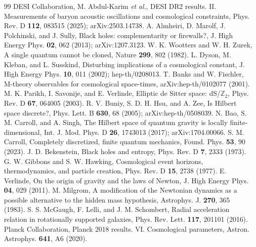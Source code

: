 \documentclass[aps,prd,twocolumn,superscriptaddress,nofootinbib]{revtex4-2}
\begin{document}
\begin{thebibliography}{99}
 DESI Collaboration, M. Abdul-Karim \emph{et al.}, DESI DR2 results. II. Measurements of baryon acoustic oscillations and cosmological constraints, Phys. Rev. D \textbf{112}, 083515 (2025); arXiv:2503.14738.
 A. Almheiri, D. Marolf, J. Polchinski, and J. Sully, Black holes: complementarity or firewalls?, J. High Energy Phys. \textbf{02}, 062 (2013); arXiv:1207.3123.
 W. K. Wootters and W. H. Zurek, A single quantum cannot be cloned, Nature \textbf{299}, 802 (1982).
 L. Dyson, M. Kleban, and L. Susskind, Disturbing implications of a cosmological constant, J. High Energy Phys. \textbf{10}, 011 (2002); hep-th/0208013.
 T. Banks and W. Fischler, M-theory observables for cosmological space-times, arXiv:hep-th/0102077 (2001).
 M. K. Parikh, I. Savonije, and E. Verlinde, Elliptic de Sitter space: dS/$\mathbb{Z}_2$, Phys. Rev. D \textbf{67}, 064005 (2003).
 R. V. Buniy, S. D. H. Hsu, and A. Zee, Is Hilbert space discrete?, Phys. Lett. B \textbf{630}, 68 (2005); arXiv:hep-th/0508039.
 N. Bao, S. M. Carroll, and A. Singh, The Hilbert space of quantum gravity is locally finite-dimensional, Int. J. Mod. Phys. D \textbf{26}, 1743013 (2017); arXiv:1704.00066.
 S. M. Carroll, Completely discretized, finite quantum mechanics, Found. Phys. \textbf{53}, 90 (2023).
 J. D. Bekenstein, Black holes and entropy, Phys. Rev. D \textbf{7}, 2333 (1973).
 G. W. Gibbons and S. W. Hawking, Cosmological event horizons, thermodynamics, and particle creation, Phys. Rev. D \textbf{15}, 2738 (1977).
 E. Verlinde, On the origin of gravity and the laws of Newton, J. High Energy Phys. \textbf{04}, 029 (2011).
 M. Milgrom, A modification of the Newtonian dynamics as a possible alternative to the hidden mass hypothesis, Astrophys. J. \textbf{270}, 365 (1983).
 S. S. McGaugh, F. Lelli, and J. M. Schombert, Radial acceleration relation in rotationally supported galaxies, Phys. Rev. Lett. \textbf{117}, 201101 (2016).
 Planck Collaboration, Planck 2018 results. VI. Cosmological parameters, Astron. Astrophys. \textbf{641}, A6 (2020).
\end{thebibliography}
\end{document}
